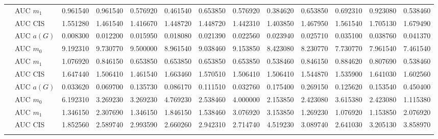 \begin{table}[htbp]
\begin{tabular}{llrrrrrrrrrrr}
    & AUC $m_1$ & 0.961540 & 0.961540 & 0.576920 & 0.461540 & 0.653850 & 0.576920 & 0.384620 & 0.653850 & 0.692310 & 0.923080 & 0.538460 \\
    & AUC CIS & 1.551280 & 1.461540 & 1.416670 & 1.448720 & 1.448720 & 1.442310 & 1.403850 & 1.467950 & 1.561540 & 1.705130 & 1.679490 \\
    \addlinespace
    \multirow{4}{*}{degree} & AUC $a(G)$ & 0.008300 & 0.012200 & 0.015950 & 0.018080 & 0.021390 & 0.022560 & 0.023940 & 0.025710 & 0.035100 & 0.038760 & 0.041370 \\
    & AUC $m_0$ & 9.192310 & 9.730770 & 9.500000 & 8.961540 & 9.038460 & 9.153850 & 8.423080 & 8.230770 & 7.730770 & 7.961540 & 7.461540 \\
    & AUC $m_1$ & 1.076920 & 0.846150 & 0.653850 & 0.653850 & 0.653850 & 0.653850 & 0.538460 & 0.846150 & 0.884620 & 0.807690 & 0.538460 \\
    & AUC CIS & 1.647440 & 1.506410 & 1.461540 & 1.663460 & 1.570510 & 1.506410 & 1.506410 & 1.544870 & 1.535900 & 1.641030 & 1.602560 \\
    \addlinespace
    \multirow{4}{*}{random} & AUC $a(G)$ & 0.033620 & 0.069700 & 0.135730 & 0.086170 & 0.111510 & 0.032760 & 0.175400 & 0.269150 & 0.125620 & 0.153540 & 0.450400 \\
    & AUC $m_0$ & 6.192310 & 3.269230 & 3.269230 & 4.769230 & 2.538460 & 4.000000 & 2.153850 & 2.423080 & 3.615380 & 2.423080 & 1.115380 \\
    & AUC $m_1$ & 1.346150 & 2.307690 & 1.346150 & 1.846150 & 1.538460 & 3.076920 & 3.153850 & 1.269230 & 1.076920 & 1.153850 & 2.076920 \\
    & AUC CIS & 1.852560 & 2.589740 & 2.993590 & 2.660260 & 2.942310 & 2.714740 & 4.519230 & 3.089740 & 2.641030 & 3.205130 & 3.858970 \\
    \addlinespace
    \bottomrule
  \end{tabular}
\end{table}

